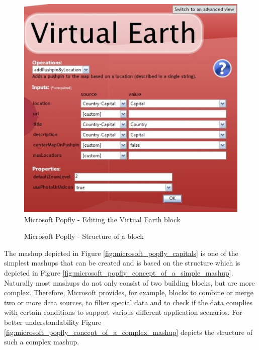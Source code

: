\begin{figure}
	\centering
		\includegraphics{Bilder/microsoft_popfly_edit_block.jpg}
	\caption{Microsoft Popfly - Editing the Virtual Earth block}
	\label{fig:microsoft_popfly_edit_block}
\end{figure}

\begin{figure}
	\centering
	\caption{Microsoft Popfly - Structure of a block}
	\label{fig:microsoft_popfly_concept_of_a_block}
\end{figure}

The mashup depicted in Figure \ref{fig:microsoft_popfly_capitals} is one of the simplest mashups that
can be created and is based on the structure which is depicted in Figure
\ref{fig:microsoft_popfly_concept_of_a_simple_mashup}. Naturally most mashups do not only consist of
two building blocks, but are more complex. Therefore, Microsoft provides, for example, blocks to
combine or merge two or more data sources, to filter special data and to check if the data complies
with certain conditions to support various different application scenarios. For better
understandability Figure \ref{fig:microsoft_popfly_concept_of_a_complex_mashup} depicts the
structure of such a complex mashup.

